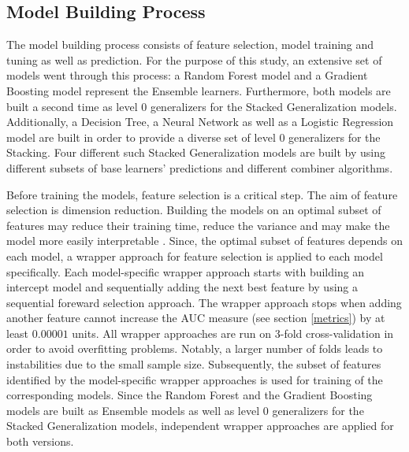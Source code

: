 \documentclass[12pt]{article}
\begin{document}
\subsection{Model Building Process}
The model building process consists of feature selection, model training and tuning as well as prediction. For the purpose of this study, an extensive set of models went through this process: a Random Forest model and a Gradient Boosting model represent the Ensemble learners. Furthermore, both models are built a second time as level 0 generalizers for the Stacked Generalization models. Additionally, a Decision Tree, a Neural Network as well as a Logistic Regression model are built in order to provide a diverse set of level 0 generalizers for the Stacking. Four different such Stacked Generalization models are built by using different subsets of base learners' predictions and different combiner algorithms. 

Before training the models, feature selection is a critical step. The aim of feature selection is dimension reduction. Building the models on an optimal subset of features may reduce their training time, reduce the variance and may make the model more easily interpretable \citep{guyon2003introduction}. Since, the optimal subset of features depends on each model, a wrapper approach for feature selection is applied to each model specifically. Each model-specific wrapper approach starts with building an intercept model and sequentially adding the next best feature by using a sequential foreward selection approach. The wrapper approach stops when adding another feature cannot increase the AUC measure (see section \ref{metrics}) by at least $0.00001$ units. All wrapper approaches are run on 3-fold cross-validation in order to avoid overfitting problems. Notably, a larger number of folds leads to instabilities due to the small sample size. Subsequently, the subset of features identified by the model-specific wrapper approaches is used for training of the corresponding models. Since the Random Forest and the Gradient Boosting models are built as Ensemble models as well as level 0 generalizers for the Stacked Generalization models, independent wrapper approaches are applied for both versions.
\end{document}
